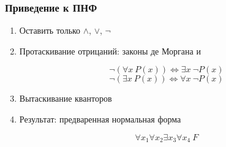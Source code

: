 \documentclass[24pt,pdf,hyperref={unicode}]{beamer}
\begin{document}
\begin{frame}\frametitle{Приведение к ПНФ}
\begin{enumerate}
\item<1-> Оставить только $\wedge$, $\vee$, $\neg$
\item<2-> Протаскивание отрицаний: законы де Моргана и

$$
\neg(\forall x\ P(x))\Leftrightarrow \exists x\ \neg P(x)
$$
$$
\neg(\exists x\ P(x))\Leftrightarrow \forall x\ \neg P(x)
$$
\item<3-> { Вытаскивание кванторов }

\begin{center}






\end{center}
\item<9-> Результат: предваренная нормальная форма

$$
\forall x_1 \forall x_2 \exists x_3 \forall x_4\ F
$$
\end{enumerate}

\end{frame}
\end{document}
